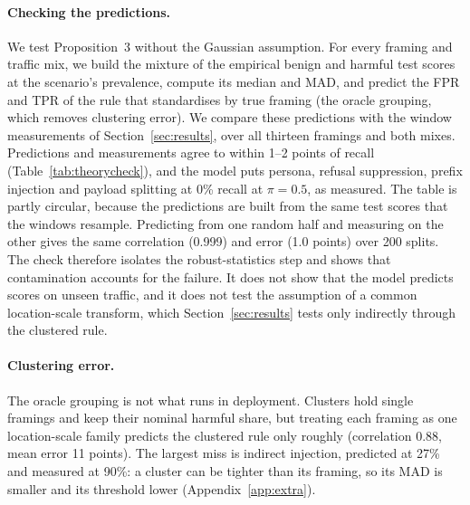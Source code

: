 \documentclass[11pt]{article}
\begin{document}
\paragraph{Checking the predictions.}
We test Proposition~3 without the Gaussian assumption. For every framing and traffic mix, we build the mixture of the empirical benign and harmful test scores at the scenario's prevalence, compute its median and MAD, and predict the FPR and TPR of the rule that standardises by true framing (the oracle grouping, which removes clustering error). We compare these predictions with the window measurements of Section~\ref{sec:results}, over all thirteen framings and both mixes. Predictions and measurements agree to within 1--2 points of recall (Table~\ref{tab:theorycheck}), and the model puts persona, refusal suppression, prefix injection and payload splitting at 0\% recall at $\pi=0.5$, as measured. The table is partly circular, because the predictions are built from the same test scores that the windows resample. Predicting from one random half and measuring on the other gives the same correlation (0.999) and error (1.0 points) over 200 splits. The check therefore isolates the robust-statistics step and shows that contamination accounts for the failure. It does not show that the model predicts scores on unseen traffic, and it does not test the assumption of a common location-scale transform, which Section~\ref{sec:results} tests only indirectly through the clustered rule.

\begin{table}[t]
\centering

\caption{Predicted versus measured firing of the oracle-grouped robust-$z$ rule, over 13 framings and 2 traffic mixes (26 points per model). Correlation, and mean absolute error in percentage points.}
\label{tab:theorycheck}
\end{table}

\paragraph{Clustering error.}
The oracle grouping is not what runs in deployment. Clusters hold single framings and keep their nominal harmful share, but treating each framing as one location-scale family predicts the clustered rule only roughly (correlation 0.88, mean error 11 points). The largest miss is indirect injection, predicted at 27\% and measured at 90\%: a cluster can be tighter than its framing, so its MAD is smaller and its threshold lower (Appendix~\ref{app:extra}).
\end{document}
